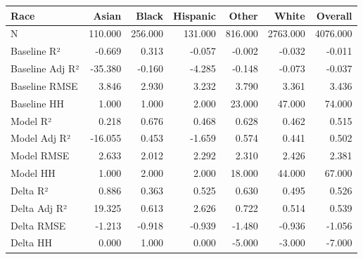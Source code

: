 \begin{tabular}{lrrrrrr}
\toprule
Race &   Asian &   Black &  Hispanic &   Other &    White &  Overall \\
\midrule
N               & 110.000 & 256.000 &   131.000 & 816.000 & 2763.000 & 4076.000 \\
Baseline R²     &  -0.669 &   0.313 &    -0.057 &  -0.002 &   -0.032 &   -0.011 \\
Baseline Adj R² & -35.380 &  -0.160 &    -4.285 &  -0.148 &   -0.073 &   -0.037 \\
Baseline RMSE   &   3.846 &   2.930 &     3.232 &   3.790 &    3.361 &    3.436 \\
Baseline HH     &   1.000 &   1.000 &     2.000 &  23.000 &   47.000 &   74.000 \\
Model R²        &   0.218 &   0.676 &     0.468 &   0.628 &    0.462 &    0.515 \\
Model Adj R²    & -16.055 &   0.453 &    -1.659 &   0.574 &    0.441 &    0.502 \\
Model RMSE      &   2.633 &   2.012 &     2.292 &   2.310 &    2.426 &    2.381 \\
Model HH        &   1.000 &   2.000 &     2.000 &  18.000 &   44.000 &   67.000 \\
Delta R²        &   0.886 &   0.363 &     0.525 &   0.630 &    0.495 &    0.526 \\
Delta Adj R²    &  19.325 &   0.613 &     2.626 &   0.722 &    0.514 &    0.539 \\
Delta RMSE      &  -1.213 &  -0.918 &    -0.939 &  -1.480 &   -0.936 &   -1.056 \\
Delta HH        &   0.000 &   1.000 &     0.000 &  -5.000 &   -3.000 &   -7.000 \\
\bottomrule
\end{tabular}
